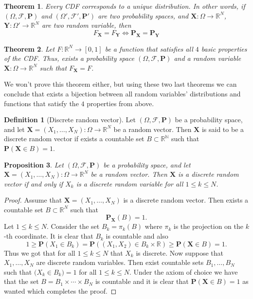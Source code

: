 \documentclass[11pt,a4paper]{article}
\theoremstyle{definition}
\newtheorem{definition}{Definition}[section]
\theoremstyle{plain}
\newtheorem{theorem}{Theorem}[section]
\newtheorem{proposition}[theorem]{Proposition}
\newcommand{\N}{\mathbb{N}}
\newcommand{\R}{\mathbb{R}}
\newcommand{\Prob}{\mathbf{P}}
\renewcommand{\vec}[1]{\boldsymbol{\mathbf{#1}}}
\begin{document}
  \begin{theorem}
    Every CDF corresponds to a unique distribution. In other words, if
    $(\Omega, \mathcal F, \Prob)$ and $(\Omega', \mathcal F', \Prob')$
    are two probability spaces, and $\vec{X} \colon \Omega \to \R^N$,
    $\vec{Y} \colon \Omega' \to \R^N$ are two random variable, then
    \[
      F_{\vec{X}} = F_{\vec{Y}} \iff 
      \Prob_{\vec{X}} = \Prob_{\vec{Y}}
    \]
  \end{theorem}
  \begin{theorem}
    Let $F \colon \R^N \to [0,1]$ be a function that satisfies all $4$ basic
    properties of the CDF. Thus, exists a probability space 
    $(\Omega, \mathcal F, \Prob)$ and a random variable 
    $\vec{X} \colon \Omega \to \R^N$ such that $F_{\vec{X}} = F$.
  \end{theorem}
  We won't prove this theorem either, but using these two last theorems
  we can conclude that exists a bijection between all random variables'
  distributions and functions that satisfy the $4$ properties from above.

  \begin{definition}[Discrete random vector]
    Let $(\Omega, \mathcal F, \Prob)$ be a probability space, 
    and let $\vec{X} = (X_1,\dots,X_N) \colon \Omega \to \R^N$ be a random vector.
    Then $\vec{X}$ is said to be a discrete random vector if exists a countable
    set $B \subset \R^\N$ such that $\Prob(\vec{X} \in B) = 1$.
  \end{definition}

  \begin{proposition}
    Let $(\Omega, \mathcal F, \Prob)$ be a probability space, 
    and let $\vec{X} = (X_1,\dots,X_N) \colon \Omega \to \R^N$ be a random vector.
    Then $\vec{X}$ is a discrete random vector if and only if $X_k$ is a discrete
    random variable for all $1 \le k \le N$.
  \end{proposition}
  \begin{proof}
    Assume that $\vec{X} = (X_1,\dots,X_N)$ is a discrete random vector.
    Then exists a countable set $B \subset \R^N$ such that
    \[
      \Prob_{\vec{X}}(B) = 1.
    \]
    Let $1 \le k \le N$. Consider the set $B_k = \pi_k(B)$ where $\pi_k$ is the
    projection on the $k$-th coordinate. It is clear that $B_k$ is countable
    and also
    \[
      1 \geq
      \Prob(X_1 \in B_k) =
      \Prob\left((X_1,X_2) \in B_k \times \R\right) \geq
      \Prob(\vec{X} \in B) =
      1.
    \]
    Thus we got that for all $1 \le k \le N$ that $X_k$ is discrete.
    Now suppose that $X_1,\dots,X_N$ are discrete random variables.
    Then exist countable sets $B_1,\dots,B_N$ such that 
    $\mathbf (X_k \in B_k) = 1$ for all $1 \le k \le N$.
    Under the axiom of choice we have that the set 
    $B = B_1 \times \cdots \times B_N$ is countable and it is clear that
    $\Prob(\vec{X} \in B) = 1$ as wanted which completes the proof.
  \end{proof}
  
\end{document}
